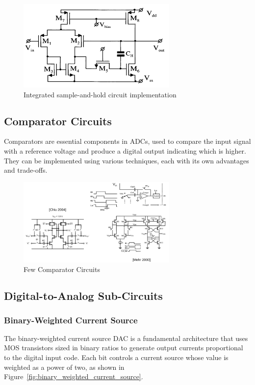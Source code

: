 \begin{figure}[h]
    \centering
    \includegraphics[width=0.7\textwidth]{figs/practical_sh_config.png}
    \caption{Integrated sample-and-hold circuit implementation}
    \label{fig:practical_sh_circuit}
\end{figure}

\subsection{Comparator Circuits}
Comparators are essential components in ADCs, used to compare the input signal with a reference voltage and produce a digital output indicating which is higher. They can be implemented using various techniques, each with its own advantages and trade-offs.
\begin{figure}
    \centering
    \includegraphics[width=0.7\textwidth]{figs/compartator_circuits.png}
    \caption{Few Comparator Circuits}
    \label{fig:comparator_circuit}
\end{figure}
\subsection{Digital-to-Analog Sub-Circuits}
\subsubsection{Binary-Weighted Current Source}
The binary-weighted current source DAC is a fundamental architecture that uses MOS transistors sized in binary ratios to generate output currents proportional to the digital input code. Each bit controls a current source whose value is weighted as a power of two, as shown in Figure~\ref{fig:binary_weighted_current_source}.

